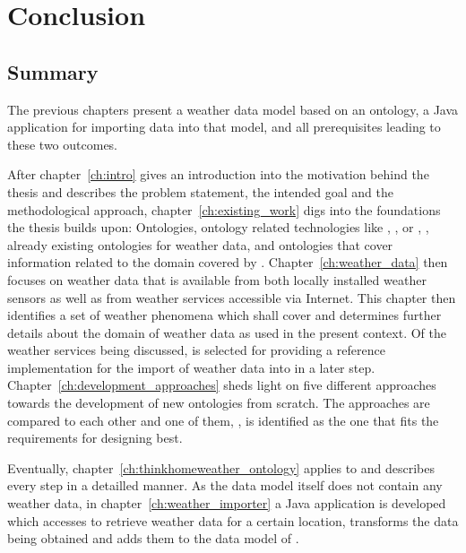 \chapter{Conclusion}
\label{ch:conclusion}

\section{Summary}

The previous chapters present a weather data model based on an  ontology, a Java application for importing data into that model, and all prerequisites leading to these two outcomes.

After chapter~\ref{ch:intro} gives an introduction into the motivation behind the thesis and describes the problem statement, the intended goal and the methodological approach, chapter~\ref{ch:existing_work} digs into the foundations the thesis builds upon: Ontologies, ontology related technologies like , , or , \thinkhome, already existing ontologies for weather data, and ontologies that cover information related to the domain covered by \thinkhomeweather. Chapter~\ref{ch:weather_data} then focuses on weather data that is available from both locally installed weather sensors as well as from weather services accessible via Internet. This chapter then identifies a set of weather phenomena which \thinkhomeweather shall cover and determines further details about the domain of weather data as used in the present context.
Of the weather services being discussed, \yrno is selected for providing a reference implementation for the import of weather data into \thinkhomeweather in a later step. Chapter~\ref{ch:development_approaches} sheds light on five different approaches towards the development of new ontologies from scratch. The approaches are compared to each other and one of them, \methontology, is identified as the one that fits the requirements for designing \thinkhomeweather best.

Eventually, chapter~\ref{ch:thinkhomeweather_ontology} applies \methontology to \thinkhomeweather and describes every step in a detailled manner. As the data model itself does not contain any weather data, in chapter~\ref{ch:weather_importer} a Java application is developed which accesses \yrno to retrieve weather data for a certain location, transforms the data being obtained and adds them to the data model of \thinkhomeweather.

